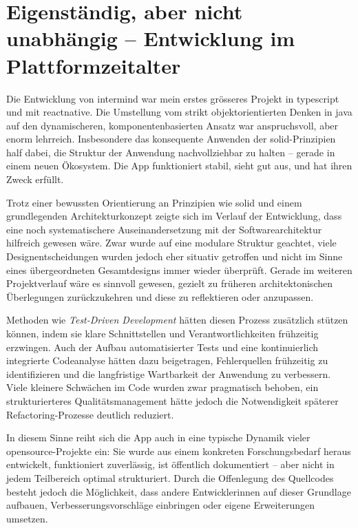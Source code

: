 \section{Eigenständig, aber nicht unabhängig -- Entwicklung im Plattformzeitalter}

Die Entwicklung von \gls{intermind} war mein erstes grösseres Projekt in \gls{typescript} und mit \gls{reactnative}. Die Umstellung vom strikt objektorientierten Denken in \gls{java} auf den dynamischeren, komponentenbasierten Ansatz war anspruchsvoll, aber enorm lehrreich. Insbesondere das konsequente Anwenden der \gls{solid}-Prinzipien half dabei, die Struktur der Anwendung nachvollziehbar zu halten -- gerade in einem neuen Ökosystem. Die App funktioniert stabil, sieht gut aus, und hat ihren Zweck erfüllt.

Trotz einer bewussten Orientierung an Prinzipien wie \gls{solid} und einem grundlegenden Architekturkonzept zeigte sich im Verlauf der Entwicklung, dass eine noch systematischere Auseinandersetzung mit der Softwarearchitektur hilfreich gewesen wäre. Zwar wurde auf eine modulare Struktur geachtet, viele Designentscheidungen wurden jedoch eher situativ getroffen und nicht im Sinne eines übergeordneten Gesamtdesigns immer wieder überprüft. Gerade im weiteren Projektverlauf wäre es sinnvoll gewesen, gezielt zu früheren architektonischen Überlegungen zurückzukehren und diese zu reflektieren oder anzupassen.

Methoden wie \emph{Test-Driven Development} hätten diesen Prozess zusätzlich stützen können, indem sie klare Schnittstellen und Verantwortlichkeiten frühzeitig erzwingen. Auch der Aufbau automatisierter Tests und eine kontinuierlich integrierte Codeanalyse hätten dazu beigetragen, Fehlerquellen frühzeitig zu identifizieren und die langfristige Wartbarkeit der Anwendung zu verbessern. Viele kleinere Schwächen im Code wurden zwar pragmatisch behoben, ein strukturierteres Qualitätsmanagement hätte jedoch die Notwendigkeit späterer Refactoring-Prozesse deutlich reduziert.

In diesem Sinne reiht sich die App auch in eine typische Dynamik vieler \gls{opensource}-Projekte ein: Sie wurde aus einem konkreten Forschungsbedarf heraus entwickelt, funktioniert zuverlässig, ist öffentlich dokumentiert -- aber nicht in jedem Teilbereich optimal strukturiert. Durch die Offenlegung des Quellcodes besteht jedoch die Möglichkeit, dass andere Entwickler\genderstern innen auf dieser Grundlage aufbauen, Verbesserungsvorschläge einbringen oder eigene Erweiterungen umsetzen.

